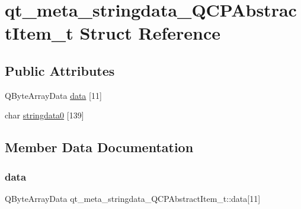 \hypertarget{structqt__meta__stringdata___q_c_p_abstract_item__t}{}\section{qt\+\_\+meta\+\_\+stringdata\+\_\+\+Q\+C\+P\+Abstract\+Item\+\_\+t Struct Reference}
\label{structqt__meta__stringdata___q_c_p_abstract_item__t}
\subsection*{Public Attributes}
\begin{DoxyCompactItemize}
\item 
Q\+Byte\+Array\+Data \mbox{\hyperlink{structqt__meta__stringdata___q_c_p_abstract_item__t_a9e33f2a80b5df62d63aafd9326b07a92}{data}} \mbox{[}11\mbox{]}
\item 
char \mbox{\hyperlink{structqt__meta__stringdata___q_c_p_abstract_item__t_a4a1f8f9acd2583f039a05de696c20ba6}{stringdata0}} \mbox{[}139\mbox{]}
\end{DoxyCompactItemize}


\subsection{Member Data Documentation}
\mbox{\label{structqt__meta__stringdata___q_c_p_abstract_item__t_a9e33f2a80b5df62d63aafd9326b07a92}} 
\subsubsection{\texorpdfstring{data}{data}}
{\footnotesize\ttfamily Q\+Byte\+Array\+Data qt\+\_\+meta\+\_\+stringdata\+\_\+\+Q\+C\+P\+Abstract\+Item\+\_\+t\+::data\mbox{[}11\mbox{]}}

\mbox{\label{structqt__meta__stringdata___q_c_p_abstract_item__t_a4a1f8f9acd2583f039a05de696c20ba6}} 
